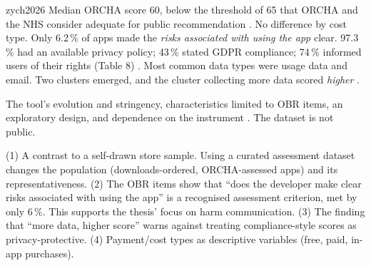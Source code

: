 \begin{papercard}{zych2026}
 Median ORCHA score 60, below the threshold of 65 that ORCHA and the NHS consider adequate for public recommendation . No difference by cost type. Only 6.2\,\% of apps made the \emph{risks associated with using the app} clear. 97.3\,\% had an available privacy policy; 43\,\% stated GDPR compliance; 74\,\% informed users of their rights (Table 8) . Most common data types were usage data and email. Two clusters emerged, and the cluster collecting more data scored \emph{higher} .

 The tool's evolution and stringency, characteristics limited to OBR items, an exploratory design, and dependence on the instrument . The dataset is not public.

 (1) A contrast to a self-drawn store sample. Using a curated assessment dataset changes the population (downloads-ordered, ORCHA-assessed apps) and its representativeness. (2) The OBR items show that ``does the developer make clear risks associated with using the app'' is a recognised assessment criterion, met by only 6\,\%. This supports the thesis' focus on harm communication. (3) The finding that ``more data, higher score'' warns against treating compliance-style scores as privacy-protective. (4) Payment/cost types as descriptive variables (free, paid, in-app purchases).
\end{papercard}
